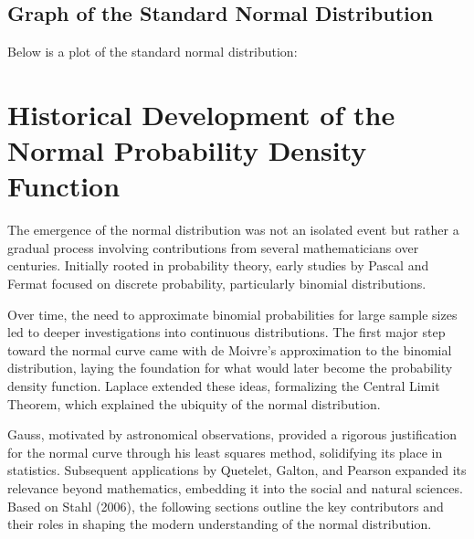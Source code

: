 \documentclass{article}
\begin{document}
\subsection{Graph of the Standard Normal Distribution}
Below is a plot of the standard normal distribution:

\begin{center}
\end{center}

\section{Historical Development of the Normal Probability Density Function}

The emergence of the normal distribution was not an isolated event but rather a gradual process involving contributions from several mathematicians over centuries. Initially rooted in probability theory, early studies by Pascal and Fermat focused on discrete probability, particularly binomial distributions. 

Over time, the need to approximate binomial probabilities for large sample sizes led to deeper investigations into continuous distributions. The first major step toward the normal curve came with de Moivre’s approximation to the binomial distribution, laying the foundation for what would later become the probability density function. Laplace extended these ideas, formalizing the Central Limit Theorem, which explained the ubiquity of the normal distribution. 

Gauss, motivated by astronomical observations, provided a rigorous justification for the normal curve through his least squares method, solidifying its place in statistics. Subsequent applications by Quetelet, Galton, and Pearson expanded its relevance beyond mathematics, embedding it into the social and natural sciences. Based on Stahl (2006), the following sections outline the key contributors and their roles in shaping the modern understanding of the normal distribution.
\end{document}
